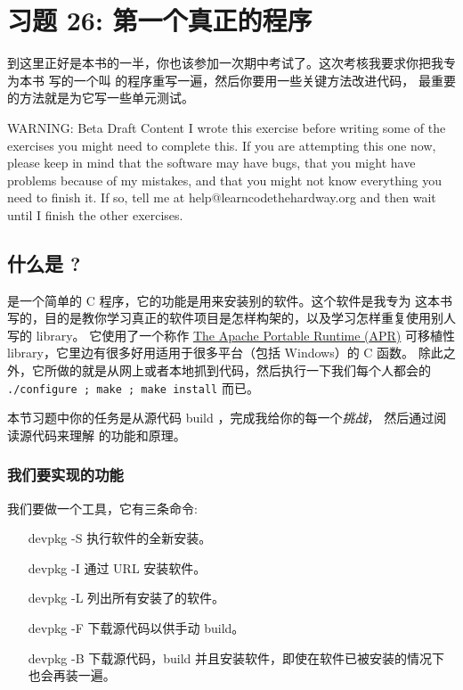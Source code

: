 \chapter{习题 26: 第一个真正的程序}

到这里正好是本书的一半，你也该参加一次期中考试了。这次考核我要求你把我专为本书
写的一个叫  的程序重写一遍，然后你要用一些关键方法改进代码，
最重要的方法就是为它写一些单元测试。

\begin{aside}{WARNING: Beta Draft Content}
I wrote this exercise before writing some of the exercises you might
need to complete this.  If you are attempting this one now, please
keep in mind that the software may have bugs, that you might have
problems because of my mistakes, and that you might not know everything
you need to finish it.  If so, tell me at help@learncodethehardway.org
and then wait until I finish the other exercises.
\end{aside}

\section{什么是 ?}

 是一个简单的 C 程序，它的功能是用来安装别的软件。这个软件是我专为
这本书写的，目的是教你学习真正的软件项目是怎样构架的，以及学习怎样重复使用别人写的 library。
它使用了一个称作 \href{http://apr.apache.org/}{The Apache Portable
Runtime (APR)} 可移植性 library，它里边有很多好用适用于很多平台（包括 Windows）的 C 函数。
除此之外，它所做的就是从网上或者本地抓到代码，然后执行一下我们每个人都会的 
\verb|./configure ; make ; make install| 而已。

本节习题中你的任务是从源代码 build ，完成我给你的每一个\emph{挑战}，
然后通过阅读源代码来理解  的功能和原理。

\subsection{我们要实现的功能}

我们要做一个工具，它有三条命令:

\begin{enumerate}
\item[devpkg -S] 执行软件的全新安装。
\item[devpkg -I] 通过 URL 安装软件。
\item[devpkg -L] 列出所有安装了的软件。
\item[devpkg -F] 下载源代码以供手动 build。
\item[devpkg -B] 下载源代码，build 并且安装软件，即使在软件已被安装的情况下也会再装一遍。
\end{enumerate}


